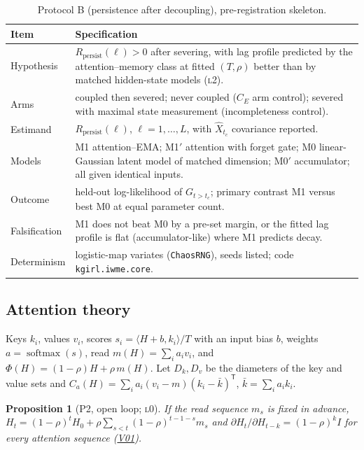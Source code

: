 \documentclass[11pt]{article}
\newtheorem{proposition}{Proposition}
\theoremstyle{definition}
\theoremstyle{remark}
\newcommand{\softmax}{\operatorname{softmax}}
\newcommand{\lvl}[1]{\textsc{l}#1}
\newcommand{\code}[1]{\texttt{#1}}
\newcommand{\V}[1]{\hyperref[app:verify]{\textsf{#1}}}
\begin{document}
\begin{table}[ht]
\centering\small
\caption{Protocol B (persistence after decoupling), pre-registration skeleton.}
\label{tab:protocolB}
\begin{tabularx}{\textwidth}{@{}l>{\raggedright\arraybackslash}X@{}}
\toprule
Item & Specification \\
\midrule
Hypothesis & $R_{\mathrm{persist}}(\ell)>0$ after severing, with lag profile predicted by the attention--memory class at fitted $(T,\rho)$ better than by matched hidden-state models (\lvl{2}). \\
Arms & coupled then severed; never coupled ($C_E$ arm control); severed with maximal state measurement (incompleteness control). \\
Estimand & $R_{\mathrm{persist}}(\ell)$, $\ell=1,\dots,L$, with $\hat X_{t_c}$ covariance reported. \\
Models & M1 attention--EMA; M1$'$ attention with forget gate; M0 linear-Gaussian latent model of matched dimension; M0$'$ accumulator; all given identical inputs. \\
Outcome & held-out log-likelihood of $G_{t>t_c}$; primary contrast M1 versus best M0 at equal parameter count. \\
Falsification & M1 does not beat M0 by a pre-set margin, or the fitted lag profile is flat (accumulator-like) where M1 predicts decay. \\
Determinism & logistic-map variates (\code{ChaosRNG}), seeds listed; code \code{kgirl.iwme.core}. \\
\bottomrule
\end{tabularx}
\end{table}

\subsection{Attention theory}\label{sec:attention}
Keys $k_i$, values $v_i$, scores $s_i=\langle H+b,k_i\rangle/T$ with an input bias $b$, weights $a=\softmax(s)$, read $m(H)=\sum_ia_iv_i$, and $\Phi(H)=(1-\rho)H+\rho\,m(H)$. Let $D_k,D_v$ be the diameters of the key and value sets and $C_a(H)=\sum_ia_i(v_i-m)(k_i-\bar k)^{\mathsf T}$, $\bar k=\sum_ia_ik_i$.

\begin{proposition}[P2, open loop; \lvl{0}]\label{prop:P2}
If the read sequence $m_s$ is fixed in advance, $H_t=(1-\rho)^tH_0+\rho\sum_{s<t}(1-\rho)^{t-1-s}m_s$ and $\partial H_t/\partial H_{t-k}=(1-\rho)^kI$ for every attention sequence (\V{V01}).
\end{proposition}
\end{document}
